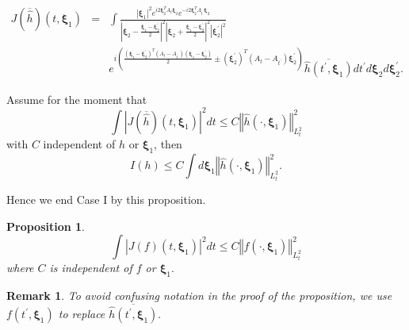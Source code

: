 \documentclass[reqno]{amsart}
\theoremstyle{plain}
\newtheorem{proposition}{Proposition}
\newtheorem{remark}{Remark}
\numberwithin{equation}{section}
\begin{document}
\begin{eqnarray*}
J(\overline{\hat{h}})(t,\mathbf{\xi }_{1}) &=&\int \frac{\left\vert \mathbf{\xi }_{1}\right\vert ^{2}e^{i2\mathbf{\xi }_{2}^{T}A_{t}\mathbf{\xi }_{2}}e^{-i2\mathbf{\xi }_{2}^{T}A_{t^{\prime }}\mathbf{\xi }_{2}}}{\left\vert \mathbf{\xi }_{2}-\frac{\mathbf{\xi }_{1}-\mathbf{\xi }_{2}^{\prime }}{2}\right\vert ^{2}\left\vert \mathbf{\xi }_{2}+\frac{\mathbf{\xi }_{1}-\mathbf{\xi }_{2}^{\prime }}{2}\right\vert ^{2}\left\vert \mathbf{\xi }_{2}^{\prime }\right\vert ^{2}} \\
&&e^{i(\frac{\left( \mathbf{\xi }_{1}-\mathbf{\xi }_{2}^{\prime }\right)
^{T}\left( A_{t}-A_{t^{\prime }}\right) \left( \mathbf{\xi }_{1}-\mathbf{\xi 
}_{2}^{\prime }\right) }{2}\pm \left( \mathbf{\xi }_{2}^{\prime }\right)
^{T}\left( A_{t}-A_{t^{\prime }}\right) \mathbf{\xi }_{2}^{\prime })}\overline{\hat{h}(t^{\prime },\mathbf{\xi }_{1})}dt^{\prime }d\mathbf{\xi }_{2}d\mathbf{\xi }_{2}^{\prime }.
\end{eqnarray*}

Assume for the moment that 
\begin{equation*}
\int \left\vert J(\overline{\hat{h}})(t,\mathbf{\xi }_{1})\right\vert
^{2}dt\leqslant C\left\Vert \hat{h}(\cdot ,\mathbf{\xi }_{1})\right\Vert
_{L_{t}^{2}}^{2}
\end{equation*}with $C$ independent of $h$ or $\mathbf{\xi }_{1}$, then\begin{equation*}
I(h)\leqslant C\int d\mathbf{\xi }_{1}\left\Vert \hat{h}(\cdot ,\mathbf{\xi }_{1})\right\Vert _{L_{t}^{2}}^{2}.
\end{equation*}

Hence we end Case I by this proposition.

\begin{proposition}
\begin{equation*}
\int \left\vert J(f)(t,\mathbf{\xi }_{1})\right\vert ^{2}dt\leqslant
C\left\Vert f(\cdot ,\mathbf{\xi }_{1})\right\Vert _{L_{t}^{2}}^{2}
\end{equation*}where $C$ is independent of $f$ or $\mathbf{\xi }_{1}.$
\end{proposition}

\begin{remark}
To avoid confusing notation in the proof of the proposition, we use $f(t^{\prime },\mathbf{\xi }_{1})$ to replace $\overline{\hat{h}(t^{\prime },\mathbf{\xi }_{1})}.$
\end{remark}
\end{document}
